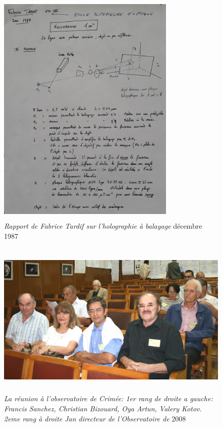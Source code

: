 \documentclass[a4paper,12pt]{article}
\begin{document}
\begin{appendix}
\begin{figure}
\centering
\includegraphics[width=8.5cm,height=11.5cm]{./figures/Tardif1987.png}
\caption[Rapport de Fabrice Tardif sur l'holographie à balayage]{\textit{Rapport de Fabrice Tardif sur l'holographie à balayage} décembre 1987}
\label{fig:18:figure18}
\end{figure}

\begin{figure}
\centering
\includegraphics[width=12.5cm,height=7.5cm]{./figures/Kotov.jpg}
\caption[Réunion à l'observatoire de Crimée]{\textit{La réunion à l'observatoire de Crimée: 1er rang de droite a gauche: Francis Sanchez, Christian Bizouard, Oya Artun, Valery Kotov. 2eme rang à droite Jan  directeur de l'Observatoire de } 2008}
\label{fig:19:figure19}
\end{figure}


\end{appendix}
\end{document}
